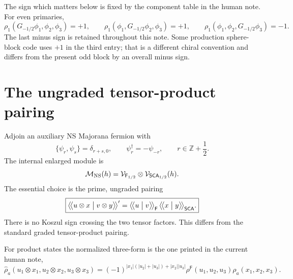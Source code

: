 \documentclass[11pt]{article}
\newcommand{\SCA}{\mathsf{SCA}}
\newcommand{\Ff}{\mathsf F}
\newcommand{\hatrho}{\widehat\rho}
\newcommand{\bpz}[2]{\bigl\langle\!\bigl\langle #1\bigm|#2\bigr\rangle\!\bigr\rangle}
\begin{document}
The sign which matters below is fixed by the component table in the human
note.  For even primaries,
\begin{equation}
 \rho_1(G_{-1/2}\phi_1,\phi_2,\phi_3)=+1,
 \qquad
 \rho_1(\phi_1,G_{-1/2}\phi_2,\phi_3)=+1,
 \qquad
 \boxed{\rho_1(\phi_1,\phi_2,G_{-1/2}\phi_3)=-1.}
 \label{eq:human-odd-table}
\end{equation}
The last minus sign is retained throughout this note.  Some production
sphere-block code uses \(+1\) in the third entry; that is a different
chiral convention and differs from the present odd block by an overall
minus sign.

\section{The ungraded tensor-product pairing}

Adjoin an auxiliary NS Majorana fermion with
\begin{equation}
 \{\psi_r,\psi_s\}=\delta_{r+s,0},
 \qquad \psi_r^\dagger=-\psi_{-r},
 \qquad r\in\mathbb Z+\frac12.
 \label{eq:fermion-algebra}
\end{equation}
The internal enlarged module is
\begin{equation}
 \mathcal M_{\rm NS}(h)
 =\mathcal V_{\Ff_{1/2}}\otimes\mathcal V_{\SCA_{1/2}}(h).
 \label{eq:enlarged-module}
\end{equation}
The essential choice is the prime, ungraded pairing
\begin{equation}
 \boxed{
 \bpz{u\otimes x}{v\otimes y}'
 =\bpz{u}{v}_{\Ff}\,\bpz{x}{y}_{\SCA}.}
 \label{eq:ungraded-pairing}
\end{equation}
There is no Koszul sign crossing the two tensor factors.  This differs from
the standard graded tensor-product pairing.

For product states the normalized three-form is the one printed in the
current human note,
\begin{equation}
 \hatrho_a(u_1\otimes x_1,u_2\otimes x_2,u_3\otimes x_3)
 =(-1)^{|x_1|(|u_2|+|u_3|)+|x_2||u_3|}
 \rho^{\Ff}(u_1,u_2,u_3)\rho_a(x_1,x_2,x_3).
 \label{eq:three-form-factorization}
\end{equation}
\end{document}
